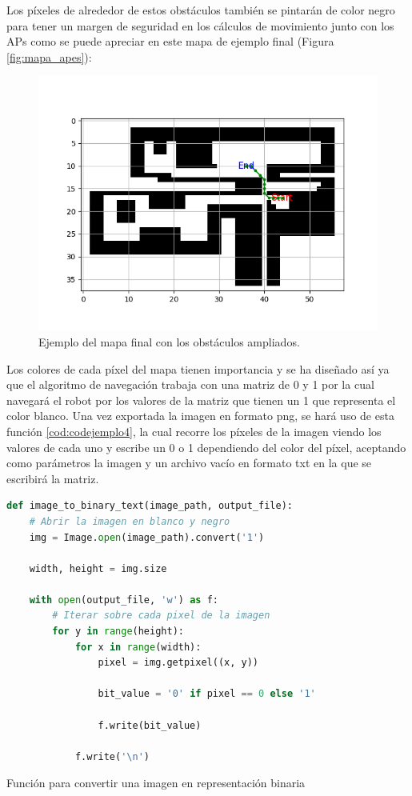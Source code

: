 Los píxeles de alrededor de estos obstáculos también se pintarán de color negro para tener un margen de seguridad en los cálculos de movimiento junto con los APs como se puede apreciar en este mapa de ejemplo final (Figura \ref{fig:mapa_apes}):


\begin{figure}[H]
  \centering
  \includegraphics[scale=0.8]{figs/astar} %
  \caption{ Ejemplo del mapa final con los obstáculos ampliados.}
  \label{fig:astar}
\end{figure}

Los colores de cada píxel del mapa tienen importancia y se ha diseñado así ya que el algoritmo de navegación trabaja con una matriz de 0 y 1 por la cual navegará el robot por los valores de la matriz que tienen un 1 que representa el color blanco. Una vez exportada la imagen en formato png, se hará uso de esta función \ref{cod:codejemplo4}, la cual recorre los píxeles de la imagen viendo los valores de cada uno y escribe un 0 o 1 dependiendo del color del píxel, aceptando como parámetros la imagen y un archivo vacío en formato txt en la que se escribirá la matriz.

\begin{code}[H]
\begin{lstlisting}[language=Python]
def image_to_binary_text(image_path, output_file):
    # Abrir la imagen en blanco y negro
    img = Image.open(image_path).convert('1') 

    width, height = img.size
   
    with open(output_file, 'w') as f:
        # Iterar sobre cada pixel de la imagen
        for y in range(height):
            for x in range(width):
                pixel = img.getpixel((x, y))

                bit_value = '0' if pixel == 0 else '1'

                f.write(bit_value)

            f.write('\n') 
\end{lstlisting}
\caption[Función para convertir una imagen en representación binaria ]{Función para convertir una imagen en representación binaria}
\label{cod:codejemplo4}
\end{code}

